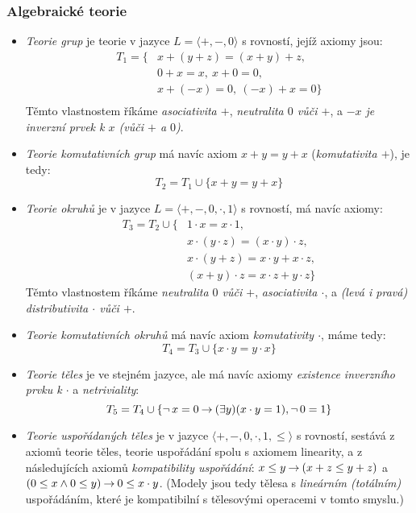 \subsubsection{Algebraické teorie}

\begin{itemize}
    \item \emph{Teorie grup} je teorie v jazyce $L=\langle +,-,0\rangle$ s rovností, jejíž axiomy jsou:
    \begin{align*}
        T_1=\{& x + (y + z) = (x + y) + z,\\
            & 0 + x = x,\ x + 0 = 0,\\
            & x + (-x) = 0,\ (-x) + x = 0\}\\
    \end{align*}
    Těmto vlastnostem říkáme \emph{asociativita $+$}, \emph{neutralita $0$ vůči $+$}, a \emph{$-x$ je inverzní prvek k $x$ (vůči $+$ a $0$)}.
    \item \emph{Teorie komutativních grup} má navíc axiom $x+y=y+x$ (\emph{komutativita $+$}), je tedy: 
    $$
    T_2=T_1\cup\{x+y=y+x\}
    $$
    \item \emph{Teorie okruhů} je v jazyce $L=\langle +,-,0,\cdot,1\rangle$ s rovností, má navíc axiomy:
    \begin{align*}
        T_3=T_2\cup\{   & 1 \cdot x = x \cdot 1,\\
        & x \cdot (y \cdot z) = (x \cdot y) \cdot z,\\
        & x \cdot (y + z) = x \cdot y + x \cdot z,\\
        & (x + y) \cdot z = x \cdot z + y \cdot z\}
    \end{align*}
    Těmto vlastnostem říkáme \emph{neutralita $0$ vůči $+$}, \emph{asociativita $\cdot$}, a \emph{(levá i pravá) distributivita $\cdot$ vůči $+$}.
    \item \emph{Teorie komutativních okruhů} má navíc axiom \emph{komutativity $\cdot$}, máme tedy:
    $$
    T_4 = T_3 \cup \{x \cdot y = y \cdot x\}
    $$
    \item \emph{Teorie těles} je ve stejném jazyce, ale má navíc axiomy \emph{existence inverzního prvku k $\cdot$} a \emph{netriviality}:
    $$
    T_5 = T_4 \cup \{\neg\,x=0 \mathbin{\rightarrow} (\exists y)(x\cdot y = 1), \neg\,0=1\}
    $$
    \item \emph{Teorie uspořádaných těles} je v jazyce $\langle +, -, 0,\cdot,1,\leq\rangle$ s rovností, sestává z axiomů teorie těles, teorie uspořádání spolu s axiomem linearity, a z následujících axiomů \emph{kompatibility uspořádání}: $x\leq y\mathbin{\rightarrow} (x+z\leq y+z)$ a $(0\leq x\land 0\leq y)\mathbin{\rightarrow} 0\leq x\cdot y$. (Modely jsou tedy tělesa s \emph{lineárním (totálním)} uspořádáním, které je kompatibilní s tělesovými operacemi v tomto smyslu.)
\end{itemize}


